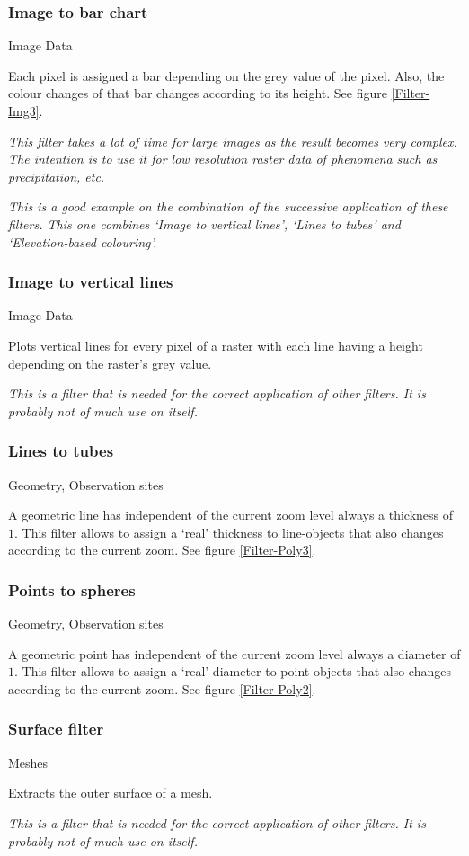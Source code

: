 \subsubsection{Image to bar chart}
 Image Data

 Each pixel is assigned a bar depending on the grey value of the pixel. Also, the colour changes of that bar changes according to its height. See figure \ref{Filter-Img3}.

 \emph{This filter takes a lot of time for large images as the result becomes very complex. The intention is to use it for low resolution raster data of phenomena such as precipitation, etc.}

\emph{This is a good example on the combination of the successive application of these filters. This one combines `Image to vertical lines', `Lines to tubes' and `Elevation-based colouring'.}

\subsubsection{Image to vertical lines}
 Image Data

 Plots vertical lines for every pixel of a raster with each line having a height depending on the raster's grey value.

 \emph{This is a filter that is needed for the correct application of other filters. It is probably not of much use on itself.}

\subsubsection{Lines to tubes}
 Geometry, Observation sites

 A geometric line has independent of the current zoom level always a thickness of $1$. This filter allows to assign a `real' thickness to line-objects that also changes according to the current zoom. See figure \ref{Filter-Poly3}.

\subsubsection{Points to spheres}
 Geometry, Observation sites

 A geometric point has independent of the current zoom level always a diameter of $1$. This filter allows to assign a `real' diameter to point-objects that also changes according to the current zoom. See figure \ref{Filter-Poly2}.

\subsubsection{Surface filter}
 Meshes

 Extracts the outer surface of a mesh.

 \emph{This is a filter that is needed for the correct application of other filters. It is probably not of much use on itself.}
